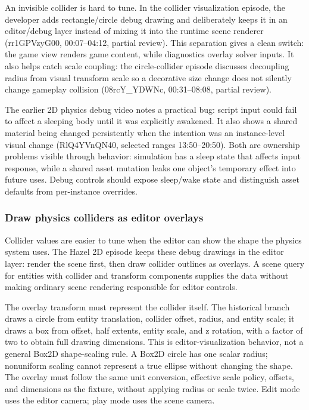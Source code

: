 An invisible collider is hard to tune. In the collider visualization episode, the developer adds rectangle/circle debug drawing and deliberately keeps it in an editor/debug layer instead of mixing it into the runtime scene renderer (rr1GPVzyG00, 00:07--04:12, partial review). This separation gives a clean switch: the game view renders game content, while diagnostics overlay solver inputs. It also helps catch scale coupling: the circle-collider episode discusses decoupling radius from visual transform scale so a decorative size change does not silently change gameplay collision (08rcY\_YDWNc, 00:31--08:08, partial review).

The earlier 2D physics debug video notes a practical bug: script input could fail to affect a sleeping body until it was explicitly awakened. It also shows a shared material being changed persistently when the intention was an instance-level visual change (RlQ4YVnQN40, selected ranges 13:50--20:50). Both are ownership problems visible through behavior: simulation has a sleep state that affects input response, while a shared asset mutation leaks one object's temporary effect into future uses. Debug controls should expose sleep/wake state and distinguish asset defaults from per-instance overrides.

\subsubsection{Draw physics colliders as editor overlays}\label{06-engine-ii-ch033-draw-physics-colliders-as-editor-overlays}

\hypertarget{06-engine-ii-ch033-draw-physics-colliders-as-editor-overlays}{}

Collider values are easier to tune when the editor can show the shape the physics system uses. The Hazel 2D episode keeps these debug drawings in the editor layer: render the scene first, then draw collider outlines as overlays. A scene query for entities with collider and transform components supplies the data without making ordinary scene rendering responsible for editor controls.

The overlay transform must represent the collider itself. The historical branch draws a circle from entity translation, collider offset, radius, and entity scale; it draws a box from offset, half extents, entity scale, and z rotation, with a factor of two to obtain full drawing dimensions. This is editor-visualization behavior, not a general Box2D shape-scaling rule. A Box2D circle has one scalar radius; nonuniform scaling cannot represent a true ellipse without changing the shape. The overlay must follow the same unit conversion, effective scale policy, offsets, and dimensions as the fixture, without applying radius or scale twice. Edit mode uses the editor camera; play mode uses the scene camera.

